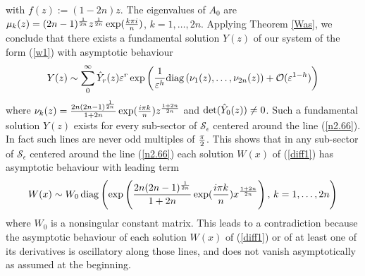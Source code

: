 \documentclass{amsart}
\theoremstyle{definition}
\theoremstyle{remark}
\theoremstyle{remark}
\begin{document}
with $f(z):=(1-2n)z$.
The eigenvalues of $A_0$ are
$\mu_k(z)=(2n-1)^{1\over 2n}z^{1\over 2n}\exp({k\pi i\over n})$,
$k=1,\dots,2n$. Applying Theorem \ref{Was}, we conclude that there exists
a fundamental solution $Y(z)$ of our system of the form (\ref{w1}) with
asymptotic behaviour
$$
Y(z)\sim \sum_0^\infty\hat Y_r(z)\varepsilon^r
\exp\left(
{1\over\varepsilon^h}{\rm diag}\left(\nu_1(z),\dots,\nu_{2n}(z)\right)+
{\mathcal O}(\varepsilon^{1-h})
\right)
$$
where $\nu_k(z)={2n(2n-1)^{1\over 2n}\over 1+2n}
\exp({i\pi k\over n})z^{1+2n\over 2n}$ and ${\rm det}(\hat Y_0(z))\neq 0$.
Such a fundamental solution $Y(z)$ exists for every sub-sector of
${\mathcal S}_\epsilon$ centered around the line (\ref{n2.66}).
In fact such lines are never odd
multiples of ${\pi\over2}$. This shows that in any sub-sector of
${\mathcal S}_\epsilon$ centered around the line (\ref{n2.66})
each solution $W(x)$ of (\ref{diff1}) has asymptotic
behaviour with leading term
$$
{W}(x)\sim {W}_0\,{\rm diag}\left(
\exp\left({2n(2n-1)^{1\over 2n}\over 1+2n} \exp({i\pi k\over n})
x^{1+2n\over 2n}\right), \, k=1,\dots, 2n\right)
$$
where ${W}_0$ is a nonsingular constant matrix. This leads to a
contradiction because the asymptotic behaviour of
each solution $W(x)$ of (\ref{diff1}) or of at least one of its
derivatives is oscillatory along those lines, and does not vanish
asymptotically as assumed at the beginning.
\end{document}
